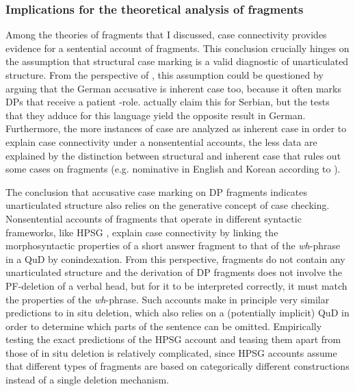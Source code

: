 \subsubsection{Implications for the theoretical analysis of fragments}

Among the theories of fragments that I discussed, case connectivity provides evidence for a sentential account of fragments. This conclusion crucially hinges on the assumption that structural case marking is a valid diagnostic of unarticulated structure. From the perspective of \citet{barton.progovac2005}, this assumption could be questioned by arguing that the German accusative is inherent case too, because it often marks DPs that receive a patient \texttheta-role. \citet{progovac.etal2006} actually claim this for Serbian, but the tests that they adduce for this language yield the opposite result in German. Furthermore, the more instances of case are analyzed as inherent case in order to explain case connectivity under a nonsentential accounts, the less data are explained by the distinction between structural and inherent case that rules out some cases on fragments (e.g. nominative in English and Korean according to \citet{barton.progovac2005}). 

The conclusion that accusative case marking on DP fragments indicates unarticulated structure also relies on the generative concept of case checking. Nonsentential accounts of fragments that operate in different syntactic frameworks, like HPSG \citep{ginzburg.sag2000, fernandez.ginzburg2002, schlangen2003}, explain case connectivity by linking the morphosyntactic properties of a short answer fragment to that of the \textit{wh}-phrase in a QuD by conindexation. From this perspective, fragments do not contain any unarticulated structure and the derivation of DP fragments does not involve the PF-deletion of a verbal head, but for it to be interpreted correctly, it must match the properties of the \textit{wh}-phrase. Such accounts make in principle very similar predictions to in situ deletion, which also relies on a (potentially implicit) QuD in order to determine which parts of the sentence can be omitted. Empirically testing the exact predictions of the HPSG account and teasing them apart from those of in situ deletion is relatively complicated, since HPSG accounts assume that different types of fragments are based on categorically different constructions instead of a single deletion mechanism.

